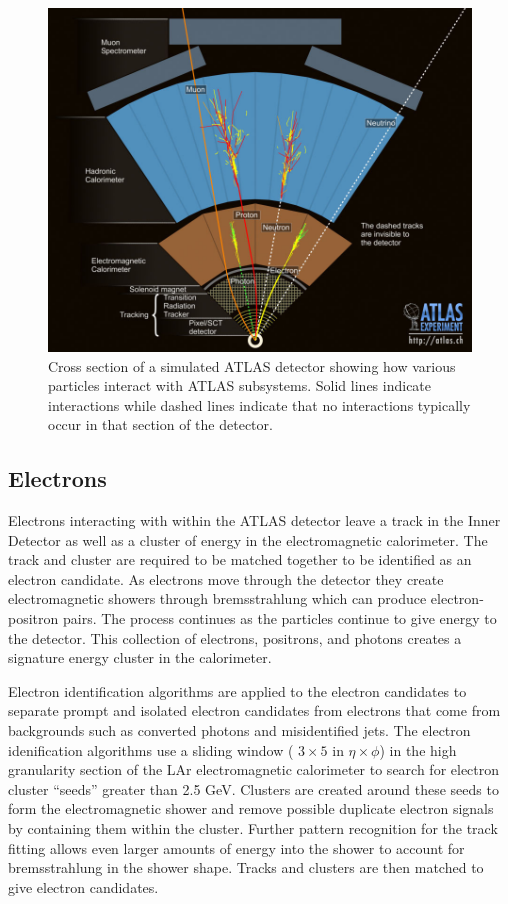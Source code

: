 \begin{figure}[h]
	\centering
	\includegraphics[width=\columnwidth]{../ThesisImages/Simulation/ParticleInteractions.jpg}
	\caption[Cross section of a simulated ATLAS detector showing how various particles interact with ATLAS subsystems.]{Cross section of a simulated ATLAS detector showing how various particles interact with ATLAS subsystems.  Solid lines indicate interactions while dashed lines indicate that no interactions typically occur in that section of the detector. \cite{ParticleInteractions} 
	}
	\label{fig:ATLASInteractions}
\end{figure}


\subsection{Electrons}
Electrons interacting with within the ATLAS detector leave a track in the Inner Detector as well as a cluster of energy in the electromagnetic calorimeter.  The track and cluster are required to be matched together to be identified as an electron candidate\cite{ElectronID}.  As electrons move through the detector they create electromagnetic showers through bremsstrahlung which can produce electron-positron pairs.  The process continues as the particles continue to give energy to the detector.  This collection of electrons, positrons, and photons creates a signature energy cluster in the calorimeter.  

Electron identification algorithms are applied to the electron candidates to separate prompt and isolated electron candidates from electrons that come from backgrounds such as converted photons and misidentified jets.  The electron idenification algorithms use a sliding window ( $3\times5$ in $\eta \times \phi$) in the high granularity section of the LAr electromagnetic calorimeter to search for electron cluster ``seeds'' greater than 2.5 GeV.  Clusters are created around these seeds to form the electromagnetic shower and remove possible duplicate electron signals by containing them within the cluster.  Further pattern recognition for the track fitting allows even larger amounts of energy into the shower to account for bremsstrahlung in the shower shape.  Tracks and clusters are then matched to give electron candidates.  


